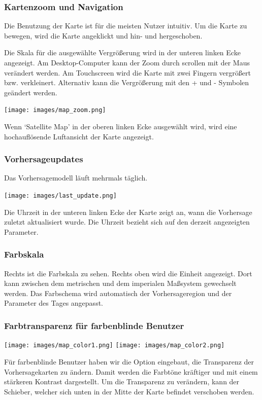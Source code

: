 \documentclass[11pt,a4paper]{article}
\begin{document}
\subsubsection{Kartenzoom und Navigation}
Die Benutzung der Karte ist für die meisten Nutzer intuitiv. Um die Karte zu bewegen, wird die Karte angeklickt und hin- und hergeschoben.

Die Skala für die ausgewählte Vergrößerung wird in der unteren linken Ecke angezeigt. Am Desktop-Computer kann der Zoom durch scrollen mit der Maus verändert werden. Am Touchscreen wird die Karte mit zwei Fingern vergrößert bzw. verkleinert. Alternativ kann die Vergrößerung mit den + und - Symbolen geändert werden.
\begin{center}
\texttt{[image: images/map\_zoom.png]}
\end{center}
Wenn `Satellite Map' in der oberen linken Ecke ausgewählt wird, wird eine hochauflösende Luftansicht der Karte angezeigt.

\subsubsection{Vorhersageupdates}
Das Vorhersagemodell läuft mehrmals täglich.
\begin{center}
\texttt{[image: images/last\_update.png]}
\end{center}
Die Uhrzeit in der unteren linken Ecke der Karte zeigt an, wann die Vorhersage zuletzt aktualisiert wurde. Die Uhrzeit bezieht sich auf den derzeit angezeigten Parameter.

\subsubsection{Farbskala}
Rechts ist die Farbskala zu sehen. Rechts oben wird die Einheit angezeigt. Dort kann zwischen dem metrischen und dem imperialen Maßsystem gewechselt werden. Das Farbschema wird automatisch der Vorhersageregion und der Parameter des Tages angepasst.

\subsubsection{Farbtransparenz für farbenblinde Benutzer}\label{subsec:colorblind}
\begin{center}
\texttt{[image: images/map\_color1.png]}
\texttt{[image: images/map\_color2.png]}
\end{center}

Für farbenblinde Benutzer haben wir die Option eingebaut, die Transparenz der Vorhersagekarten zu ändern. Damit werden die Farbtöne kräftiger und mit einem stärkeren Kontrast dargestellt. Um die Transparenz zu verändern, kann der Schieber, welcher sich unten in der Mitte der Karte befindet verschoben werden.
\end{document}
